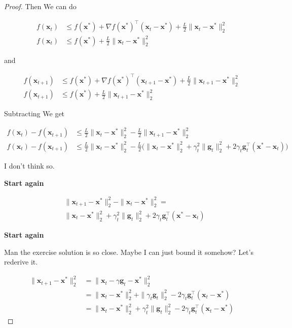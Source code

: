 \documentclass{article}
\begin{document}
\begin{proof}
	Then We can do
	
	\begin{align}
		f(\mathbf{x}_t) &\le f(\mathbf{x}^*) + \nabla f(\mathbf{x}^*)^\top(\mathbf{x}_t-\mathbf{x}^*) + \frac{L}{2}\|\mathbf{x}_t-\mathbf{x}^*\|^2_2\\
		f(\mathbf{x}_t) &\le f(\mathbf{x}^*)  + \frac{L}{2}\|\mathbf{x}_t-\mathbf{x}^*\|^2_2
	\end{align}
	
	and
	
	\begin{align}
		f(\mathbf{x}_{t+1}) &\le f(\mathbf{x}^*) + \nabla f(\mathbf{x}^*)^\top(\mathbf{x}_{t+1}-\mathbf{x}^*) + \frac{L}{2}\|\mathbf{x}_{t+1}-\mathbf{x}^*\|^2_2\\
		f(\mathbf{x}_{t+1}) &\le f(\mathbf{x}^*) + \frac{L}{2}\|\mathbf{x}_{t+1}-\mathbf{x}^*\|^2_2
	\end{align}
	
	Subtracting We get
	
	\begin{align}
		f(\mathbf{x}_t) - f(\mathbf{x}_{t+1}) &\le  \frac{L}{2}\|\mathbf{x}_t-\mathbf{x}^*\|^2_2  - \frac{L}{2}\|\mathbf{x}_{t+1}-\mathbf{x}^*\|^2_2\\
		f(\mathbf{x}_t) - f(\mathbf{x}_{t+1}) &\le  \frac{L}{2}\|\mathbf{x}_t-\mathbf{x}^*\|^2_2  - \frac{L}{2}\big( \|\mathbf{x}_t-\mathbf{x}^*\|^2_2 + \gamma_t^2\| \mathbf{g}_t\|^2_2 + 2\gamma_t \mathbf{g}_t^\top (\mathbf{x}^* - \mathbf{x}_t) \big)
	\end{align}
	
	I don't think so. 
	
	\textbf{Start again}
	
	\begin{align}
		 &\|\mathbf{x}_{t+1} - \mathbf{x}^*\|_2^2 - \|\mathbf{x}_t-\mathbf{x}^*\|_2^2 =\\
		 &\|\mathbf{x}_t-\mathbf{x}^*\|^2_2 + \gamma_t^2\| \mathbf{g}_t\|^2_2 + 2\gamma_t \mathbf{g}_t^\top (\mathbf{x}^* - \mathbf{x}_t) 
	\end{align}
	
	\textbf{Start again}
	
	Man the exercise solution is so close. Maybe I can just bound it somehow? Let's rederive it.
	
	\begin{align}
		\|\mathbf{x}_{t+1} - \mathbf{x}^*\|^2_2 &= \|\mathbf{x}_t - \gamma\mathbf{g}_t - \mathbf{x}^* \|^2_2\\
		&= \|\mathbf{x}_t  - \mathbf{x}^* \|^2_2 + \|\gamma_t\mathbf{g}_t\|^2_2 - 2 \gamma_t\mathbf{g}^\top_t(\mathbf{x}_t - \mathbf{x}^*) \\
		&= \|\mathbf{x}_t  - \mathbf{x}^* \|^2_2 + \gamma_t^2\|\mathbf{g}_t\|^2_2 - 2 \gamma_t\mathbf{g}^\top_t(\mathbf{x}_t - \mathbf{x}^*) 
	\end{align}
	

\end{proof}
\end{document}
